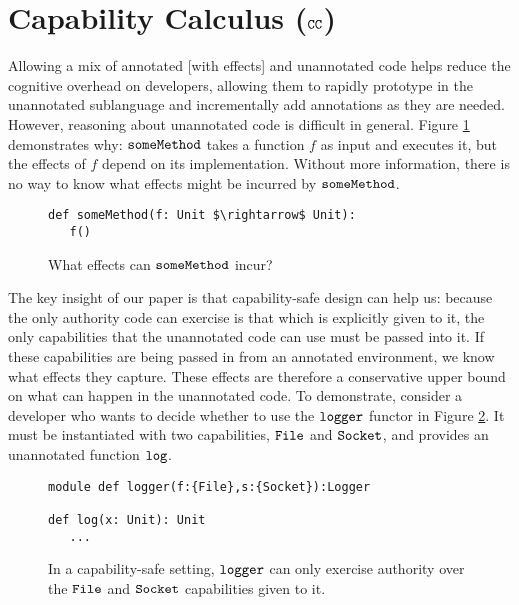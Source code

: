 \vspace{-0.3cm}
\section{Capability Calculus ($\mathtt{CC}$)}
\vspace{-0.3cm}
\label{s:cc}

Allowing a mix of annotated [with effects] and unannotated code helps
reduce the cognitive overhead on developers, allowing them to rapidly
prototype in the unannotated sublanguage and incrementally add
annotations as they are needed. However, reasoning about unannotated
code is difficult in general. Figure \ref{fig:unannotated_reasoning}
demonstrates why: $\mathtt{someMethod}$ takes a function $f$ as input and
executes it, but the effects of $f$ depend on its
implementation. Without more information, there is no way to know what
effects might be incurred by $\mathtt{someMethod}$.

\begin{figure}
\vspace{-0.8cm}
\begin{lstlisting}
def someMethod(f: Unit $\rightarrow$ Unit):
   f()
\end{lstlisting}
\vspace{-0.5cm}
\caption{What effects can $\mathtt{someMethod}$ incur?}
\vspace{-0.5cm}
\label{fig:unannotated_reasoning}
\end{figure}

The key insight of our paper is that capability-safe design can help us:
because the only authority code can exercise is that which is
explicitly given to it, the only capabilities that the unannotated
code can use must be passed into it. If these capabilities are being
passed in from an annotated environment, we know what effects they
capture. These effects are therefore a conservative upper bound on
what can happen in the unannotated code. To demonstrate, consider a
developer who wants to decide whether to use the $\mathtt{logger}$
functor in Figure \ref{fig:cc_motivation}. It must be instantiated
with two capabilities, $\mathtt{File}$ and $\mathtt{Socket}$, and provides
an unannotated function $\mathtt{log}$.

\begin{figure}
\begin{lstlisting}
module def logger(f:{File},s:{Socket}):Logger

def log(x: Unit): Unit
   ...
\end{lstlisting}
\vspace{-0.5cm}
\caption{In a capability-safe setting, $\mathtt{logger}$ can only exercise authority over the $\mathtt{File}$ and $\mathtt{Socket}$ capabilities given to it.}
\vspace{-0.5cm}
\label{fig:cc_motivation}
\end{figure}

